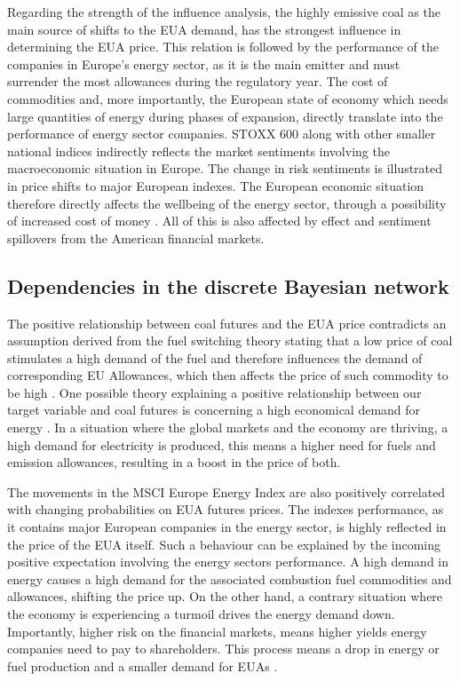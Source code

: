\documentclass[12pt, letterpaper]{article}
\begin{document}
Regarding the strength of the influence analysis, the highly emissive coal as the main source of shifts to the EUA demand, has the strongest influence in determining the EUA price. This relation is followed by the performance of the companies in Europe’s energy sector, as it is the main emitter and must surrender the most allowances during the regulatory year. The cost of commodities and, more importantly, the European state of economy which needs large quantities of energy during phases of expansion, directly translate into the performance of energy sector companies. STOXX 600 along with other smaller national indices indirectly reflects the market sentiments involving the macroeconomic situation in Europe. The change in risk sentiments is illustrated in price shifts to major European indexes. The European economic situation therefore directly affects the wellbeing of the energy sector, through a possibility of increased cost of money \parencite{tan2017}. All of this is also affected by effect and sentiment spillovers from the American financial markets.

\subsection{Dependencies in the discrete Bayesian network}

The positive relationship between coal futures and the EUA price contradicts an assumption derived from the fuel switching theory stating that a low price of coal stimulates a high demand of the fuel and therefore influences the demand of corresponding EU Allowances, which then affects the price of such commodity to be high \parencite{lovcha2021, tan2017}. One possible theory explaining a positive relationship between our target variable and coal futures is concerning a high economical demand for energy \parencite{tan2017}. In a situation where the global markets and the economy are thriving, a high demand for electricity is produced, this means a higher need for fuels and emission allowances, resulting in a boost in the price of both.

The movements in the MSCI Europe Energy Index are also positively correlated with changing probabilities on EUA futures prices. The indexes performance, as it contains major European companies in the energy sector, is highly reflected in the price of the EUA itself. Such a behaviour can be explained by the incoming positive expectation involving the energy sectors performance. A high demand in energy causes a high demand for the associated combustion fuel commodities and allowances, shifting the price up.  On the other hand, a contrary situation where the economy is experiencing a turmoil drives the energy demand down. Importantly, higher risk on the financial markets, means higher yields energy companies need to pay to shareholders. This process means a drop in energy or fuel production and a smaller demand for EUAs \parencite{zheng2021}.
\end{document}
